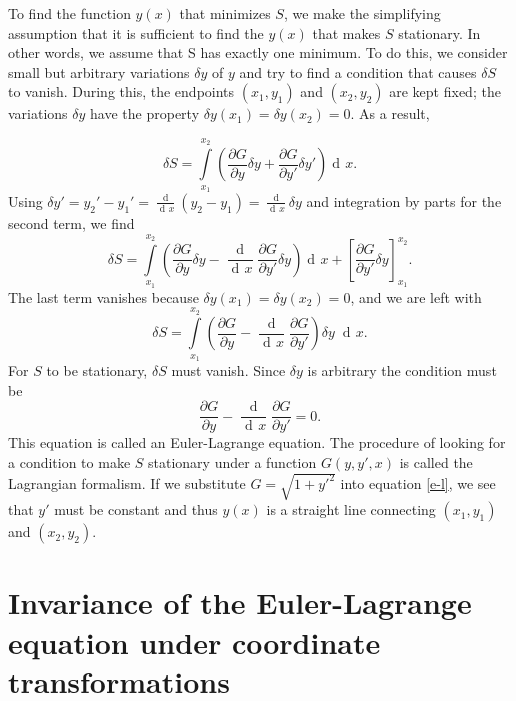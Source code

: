 \documentclass[prb,preprint]{revtex4-1}
\DeclareMathOperator{\dd}{d\!}
\DeclareMathOperator{\ddd}{\mathrm{d}}
\begin{document}
To find the function $y(x)$ that minimizes $S$, we make the simplifying assumption that it is sufficient to find the $y(x)$ that makes $S$ stationary. In other words, we assume that S has exactly one minimum.
To do this, we consider small but arbitrary variations $\delta y$ of $y$ and try to find a condition that causes $\delta S$ to vanish. 
During this, the endpoints $(x_1,y_1)$ and $(x_2,y_2)$ are kept fixed; the variations $\delta y$ have the property $\delta y(x_1) = \delta y(x_2) = 0$. 
As a result,

\begin{equation}
\delta S = \int\limits_{x_1}^{x_2} \left(\frac{\partial G}{\partial y} \delta y
+ \frac{\partial G}{\partial y'} \delta y' \right) \dd x.
\end{equation}
Using $\delta y' = y_2' - y_1' = \frac{\ddd }{\dd x}(y_2 - y_1) = \frac{\ddd}{\dd x} \delta y$ and integration by parts for the second term, we find
\begin{equation}
\delta S = \int\limits_{x_1}^{x_2} \left( \frac{\partial G}{\partial y} \delta y
- \frac{\ddd}{\dd x}\frac{\partial G}{\partial y'} \delta y \right) \dd x
+ \left[\frac{\partial G}{\partial y'} \delta y \right]_{x_1}^{x_2}.
\end{equation}
The last term vanishes because $\delta y(x_1) = \delta y(x_2) = 0$, and we are left with
\begin{equation}
\delta S = \int\limits_{x_1}^{x_2} \left( \frac{\partial G}{\partial y}
- \frac{\ddd}{\dd x}\frac{\partial G}{\partial y'} \right) \delta y \; \dd x.
\end{equation}
For $S$ to be stationary, $\delta S$ must vanish. Since $\delta y$ is arbitrary the condition must be
\begin{equation}\label{e-l}
\frac{\partial G}{\partial y} - \frac{\ddd}{\dd x}\frac{\partial G}{\partial y'} = 0.
\end{equation}
This equation is called an Euler-Lagrange equation. The procedure of looking for a condition to make $S$ stationary under a function $G(y,y',x)$ is called the Lagrangian formalism. If we substitute $G = \sqrt{1+y'^2}$ into equation \eqref{e-l}, we see that $y'$ must be constant and thus $y(x)$ is a straight line connecting $(x_1,y_1)$ and $(x_2,y_2)$.

\section{Invariance of the Euler-Lagrange equation under coordinate transformations} \label{invariance}
\end{document}
